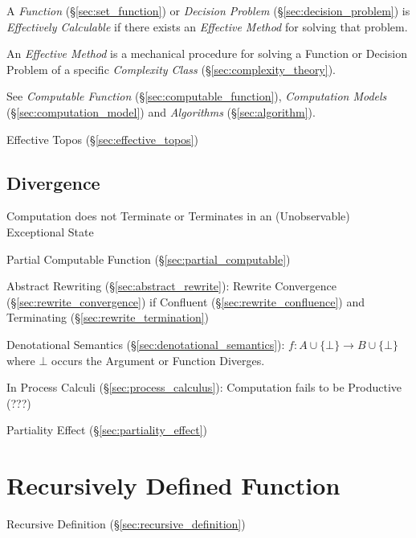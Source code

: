A \emph{Function} (\S\ref{sec:set_function}) or \emph{Decision
  Problem} (\S\ref{sec:decision_problem}) is \emph{Effectively
  Calculable} if there exists an \emph{Effective Method} for solving
that problem.

An \emph{Effective Method} is a mechanical procedure for solving a
Function or Decision Problem of a specific \emph{Complexity Class}
(\S\ref{sec:complexity_theory}).

See \emph{Computable Function} (\S\ref{sec:computable_function}),
\emph{Computation Models} (\S\ref{sec:computation_model}) and
\emph{Algorithms} (\S\ref{sec:algorithm}).

Effective Topos (\S\ref{sec:effective_topos})



\subsection{Divergence}\label{sec:computation_divergence}

Computation does not Terminate or Terminates in an (Unobservable)
Exceptional State

Partial Computable Function (\S\ref{sec:partial_computable})

Abstract Rewriting (\S\ref{sec:abstract_rewrite}): Rewrite Convergence
(\S\ref{sec:rewrite_convergence}) if Confluent
(\S\ref{sec:rewrite_confluence}) and Terminating
(\S\ref{sec:rewrite_termination})

Denotational Semantics (\S\ref{sec:denotational_semantics}): $f : A
\cup \{\bot\} \rightarrow B \cup \{\bot\}$ where $\bot$ occurs the
Argument or Function Diverges.

In Process Calculi (\S\ref{sec:process_calculus}): Computation fails
to be Productive (???) %

Partiality Effect (\S\ref{sec:partiality_effect})



\section{Recursively Defined Function}\label{sec:recursive_function}

Recursive Definition (\S\ref{sec:recursive_definition})

